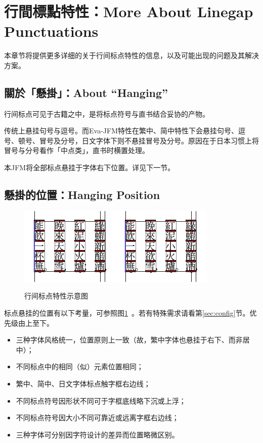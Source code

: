 \documentclass{ltjsarticle}
\def\空{\quad}
\def\段{\par}
\begin{document}
\section{行間標點特性：More About Linegap Punctuations}\label{sec:lgp}
本章节将提供更多详细的关于行间标点特性的信息，以及可能出现的问题及其解决方案。

\subsection{關於「懸掛」：About ``Hanging''}
行间标点可见于古籍之中，是将标点符号与直书结合妥协的产物。\段
传统上悬挂句号与逗号。而\textsf{Eva-JFM}特性在繁中、简中特性下会悬挂句号、逗号、顿号、冒号及分号，日文字体下则不悬挂冒号及分号。原因在于日本习惯上将冒号与分号看作「中点类」，直书时横置处理。\段
本JFM将全部标点悬挂于字体右下位置。详见下一节。

\subsection{懸掛的位置：Hanging Position}
\begin{figure}[htb]
    \centering
    \includegraphics[height = 12\zh]{figure/fig-tc.pdf}\空\includegraphics[height = 12\zh]{figure/fig-jp.pdf}
    \caption{行间标点特性示意图}\label{fig:lgp}
\end{figure}

标点悬挂的位置有以下考量，可参照图\ref{fig:lgp}~。若有特殊需求请看第\ref{sec:config}节。优先级由上至下。
\begin{itemize}
    \item 三种字体风格统一，位置原则上一致（故，繁中字体也悬挂于右下、而非居中）；
    \item 不同标点中的相同（似）元素位置相同；
    \item 繁中、简中、日文字体标点触字框右边线；
    \item 不同标点符号因形状不同可于字框底线略下沉或上浮；
    \item 不同标点符号因大小不同可靠近或远离字框右边线；
    \item 三种字体可分别因字符设计的差异而位置略微区别。
\end{itemize}
\end{document}
